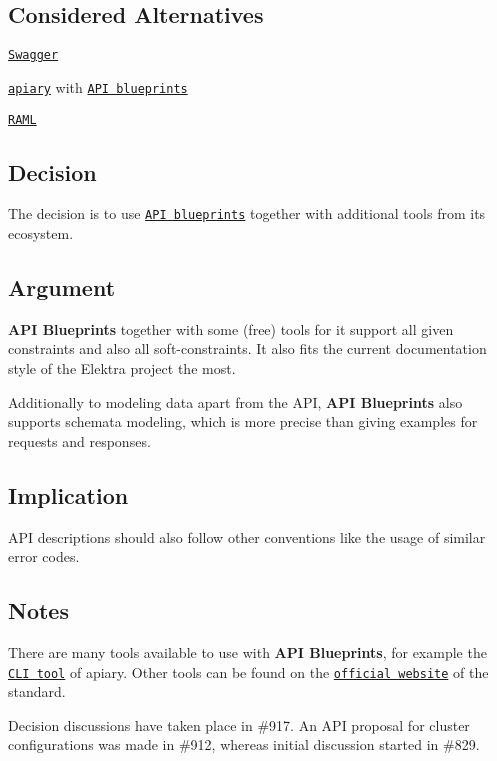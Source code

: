 \subsection*{Considered Alternatives}


\begin{DoxyItemize}
\item \href{http://swagger.io/}{\tt Swagger}
\item \href{https://apiary.io/}{\tt apiary} with \href{https://apiblueprint.org/}{\tt A\+P\+I blueprints}
\item \href{http://raml.org/}{\tt R\+A\+M\+L}
\end{DoxyItemize}

\subsection*{Decision}

The decision is to use \href{https://apiblueprint.org/}{\tt A\+P\+I blueprints} together with additional tools from its ecosystem.

\subsection*{Argument}

{\bfseries A\+P\+I Blueprints} together with some (free) tools for it support all given constraints and also all soft-\/constraints. It also fits the current documentation style of the Elektra project the most.

Additionally to modeling data apart from the A\+P\+I, {\bfseries A\+P\+I Blueprints} also supports schemata modeling, which is more precise than giving examples for requests and responses.

\subsection*{Implication}


\begin{DoxyItemize}
\item A\+P\+I descriptions should also follow other conventions like the usage of similar error codes.
\end{DoxyItemize}

\subsection*{Notes}

There are many tools available to use with {\bfseries A\+P\+I Blueprints}, for example the \href{https://github.com/apiaryio/apiary-client}{\tt C\+L\+I tool} of apiary. Other tools can be found on the \href{https://apiblueprint.org/tools.html}{\tt official website} of the standard.

Decision discussions have taken place in \#917. An A\+P\+I proposal for cluster configurations was made in \#912, whereas initial discussion started in \#829. 